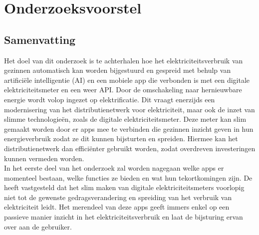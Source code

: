 \documentclass[dutch,dit,thesis]{hogentreport}
\begin{document}





%
%




\appendix

\chapter{Onderzoeksvoorstel}

\section*{Samenvatting}

Het doel van dit onderzoek is te achterhalen hoe het elektriciteitsverbruik van gezinnen automatisch kan worden bijgestuurd en gespreid met behulp van artificiële intelligentie (AI) en een mobiele app die verbonden is met een digitale elektriciteitsmeter en een weer API. Door de omschakeling naar hernieuwbare energie wordt volop ingezet op elektrificatie. Dit vraagt enerzijds een modernisering van het distributienetwerk voor elektriciteit, maar  ook de inzet van slimme technologieën, zoals de digitale elektriciteitsmeter. Deze meter kan slim gemaakt worden door er apps mee te verbinden die gezinnen inzicht geven in hun energieverbruik zodat ze dit kunnen bijsturten en spreiden. Hiermee kan het distributienetwerk dan efficiënter gebruikt worden, zodat overdreven investeringen kunnen vermeden worden. \\

In het eerste deel van het onderzoek zal worden nagegaan welke apps er momenteel bestaan, welke functies ze bieden en wat hun tekortkomingen zijn. De \textcite{VREG2021} heeft vastgesteld dat het slim maken van digitale elektriciteitsmeters voorlopig niet tot de gewenste gedragsverandering en spreiding van het verbruik van elektriciteit leidt. Het merendeel van deze apps geeft immers enkel op een passieve manier inzicht in het elektriciteitsverbruik en laat de bijsturing ervan over aan de gebruiker. \\
\end{document}
